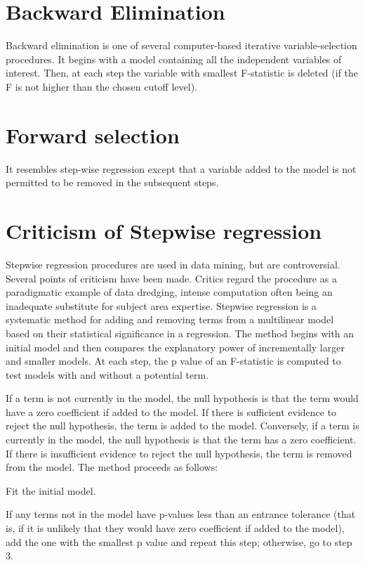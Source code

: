 \documentclass[a4paper,12pt]{article}
\begin{document}
\section{Backward Elimination}
Backward elimination is one of several computer-based iterative variable-selection procedures. It begins with a model containing all the independent variables of interest. Then, at each step the variable with smallest F-statistic is deleted (if the F is not higher than the chosen cutoff level).
\section{Forward selection}

It resembles step-wise regression except that a variable added to the model is not permitted to be removed in the subsequent steps.

\section{Criticism of Stepwise regression}

Stepwise regression procedures are used in data mining, but are controversial. Several points of criticism have been made.
Critics regard the procedure as a paradigmatic example of data dredging, intense computation often being an inadequate substitute for subject area expertise.
Stepwise regression is a systematic method for adding and removing terms from a multilinear model based on their statistical significance in a regression. The method begins with an initial model and then compares the explanatory power of incrementally larger and smaller models. At each step, the p value of an F-statistic is computed to test models with and without a potential term. 

If a term is not currently in the model, the null hypothesis is that the term would have a zero coefficient if added to the model. If there is sufficient evidence to reject the null hypothesis, the term is added to the model. Conversely, if a term is currently in the model, the null hypothesis is that the term has a zero coefficient. If there is insufficient evidence to reject the null hypothesis, the term is removed from the model. The method proceeds as follows:

Fit the initial model.

If any terms not in the model have p-values less than an entrance tolerance (that is, if it is unlikely that they would have zero coefficient if added to the model), add the one with the smallest p value and repeat this step; otherwise, go to step 3.
\end{document}
